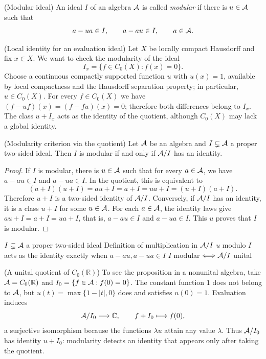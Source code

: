 \begin{cthdefinicion}{(Modular ideal)}
An ideal $I$ of an algebra $\mathcal A$ is called \emph{modular} if there is $u\in\mathcal A$ such that
\[
 a-ua\in I,\qquad a-au\in I,\qquad a\in\mathcal A.
\]
\end{cthdefinicion}

\begin{cthejemplo}{(Local identity for an evaluation ideal)}
Let $X$ be locally compact Hausdorff and fix $x\in X$.
We want to check the modularity of the ideal
\[
 I_x=\{f\in C_0(X):f(x)=0\}.
\]
Choose a continuous compactly supported function $u$ with
$u(x)=1$, available by local compactness and the Hausdorff separation property;
in particular, $u\in C_0(X)$.
For every $f\in C_0(X)$ we have
$(f-uf)(x)=(f-fu)(x)=0$; therefore both differences belong to
$I_x$. The class $u+I_x$ acts as the identity of the quotient, although
$C_0(X)$ may lack a global identity.
\end{cthejemplo}

\begin{cthproposicion}{(Modularity criterion via the quotient)}
Let $\mathcal A$ be an algebra and $I\subsetneq\mathcal A$ a proper two-sided ideal.
Then $I$ is modular if and only if $\mathcal A/I$ has an identity.
\end{cthproposicion}

\begin{proof}[Proof]
If $I$ is modular, there is $u\in\mathcal A$ such that for every
$a\in\mathcal A$, we have $a-au\in I$ and $a-ua\in I$. In the
quotient, this is equivalent to
\[
 (a+I)(u+I)=au+I=a+I=ua+I=(u+I)(a+I).
\]
Therefore $u+I$ is a two-sided identity of $\mathcal A/I$.
Conversely, if $\mathcal A/I$ has an identity, it is a class
$u+I$ for some $u\in\mathcal A$. For each $a\in\mathcal A$, the
identity laws give $au+I=a+I=ua+I$, that is,
$a-au\in I$ and $a-ua\in I$. This $u$ proves that $I$ is
modular.
\end{proof}

\proofdiagram
{$I\subsetneq\mathcal A$ a proper two-sided ideal}
{Definition of multiplication in $\mathcal A/I$}
{$u$ modulo $I$ acts as the identity exactly when $a-au,a-ua\in I$}
{$I$ modular $\Longleftrightarrow \mathcal A/I$ unital}

\begin{cthejemplo}{(A unital quotient of $C_0(\mathbb R)$)}
To see the proposition in a nonunital algebra, take
$\mathcal A=C_0(\mathbb R)$ and
$I_0=\{f\in\mathcal A:f(0)=0\}$. The constant function $1$ does not belong
to $\mathcal A$, but $u(t)=\max\{1-|t|,0\}$ does and satisfies $u(0)=1$.
Evaluation induces
\[
 \mathcal A/I_0\longrightarrow\mathbb C,\qquad f+I_0\longmapsto f(0),
\]
a surjective isomorphism because the functions $\lambda u$ attain
any value $\lambda$. Thus $\mathcal A/I_0$ has identity $u+I_0$:
modularity detects an identity that appears only after taking the quotient.
\end{cthejemplo}
